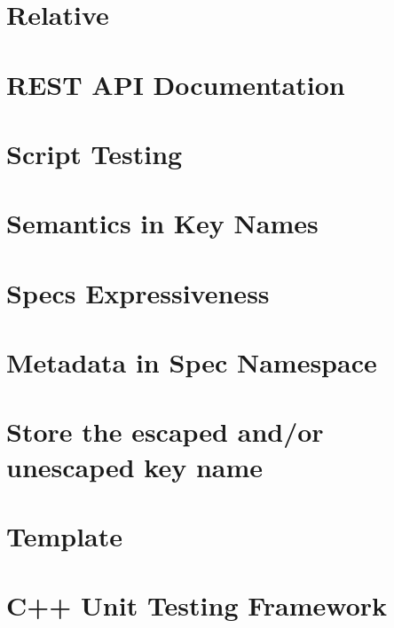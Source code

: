\documentclass[twoside]{book}
\newcommand{\+}{\discretionary{\mbox{\scriptsize$\hookleftarrow$}}{}{}}
\begin{document}
\chapter{Relative}
\label{doc_decisions_relative_md}

\chapter{R\+E\+ST A\+PI Documentation}
\label{doc_decisions_rest_api_documentation_md}

\chapter{Script Testing}
\label{doc_decisions_script_testing_md}

\chapter{Semantics in Key Names}
\label{doc_decisions_semantics_name_md}

\chapter{Spec\textquotesingle{}s Expressiveness}
\label{doc_decisions_spec_expressiveness_md}

\chapter{Metadata in Spec Namespace}
\label{doc_decisions_spec_metadata_md}

\chapter{Store the escaped and/or unescaped key name}
\label{doc_decisions_store_name_md}

\chapter{Template}
\label{doc_decisions_template_md}

\chapter{C++ Unit Testing Framework}
\label{doc_decisions_unit_testing_md}

\end{document}
